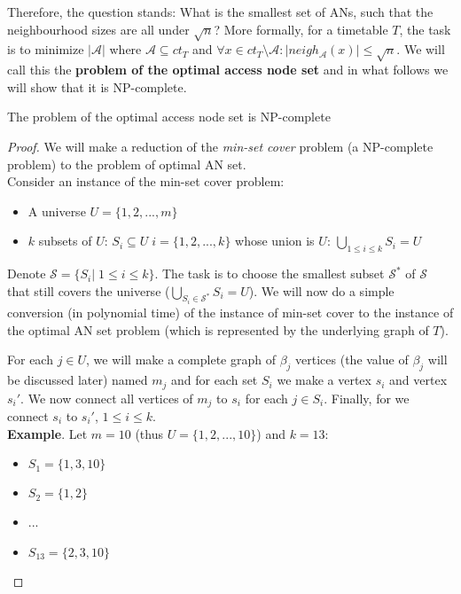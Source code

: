 		Therefore, the question stands: What is the smallest set of ANs, such that the neighbourhood sizes are all under $\sqrt{n}$? More formally, for a timetable $T$, the task is to minimize $|\mathcal{A}|$ where $\mathcal{A} \subseteq ct_{T}$ and $\forall x \in ct_{T} \setminus \mathcal{A}: |neigh_{\mathcal{A}}(x)| \leq \sqrt{n}$. We will call this the \textbf{problem of the optimal access node set} and in what follows we will show that it is NP-complete.
		
		\begin{theorem}
			The problem of the optimal access node set is NP-complete
		\end{theorem}
		
		\begin{proof}
			We will make a reduction of the \textit{min-set cover} problem (a NP-complete problem) to the problem of optimal AN set. \\
			
			\noindent Consider an instance of the min-set cover problem:
			\begin{itemize}
				\item A universe $U = \{1, 2, ..., m\}$
				\item $k$ subsets of $U$: $S_{i} \subseteq U \; i = \{1, 2, ..., k\}$ whose union is $U$: $\bigcup\limits_{1 \leq i \leq k} S_{i} = U$
			\end{itemize}
			\hspace*{\fill}
			
			\noindent Denote $\mathcal{S} = \{S_{i}| \; 1 \leq i \leq k\}$. The task is to choose the smallest subset $\mathcal{S}^{*}$ of $\mathcal{S}$ that still covers the universe ($\bigcup\limits_{S_{i} \in \mathcal{S}^{*}} S_{i} = U$). We will now do a simple conversion (in polynomial time) of the instance of min-set cover to the instance of the optimal AN set problem (which is represented by the underlying graph of $T$).
			
			 For each $j \in U$, we will make a complete graph of $\beta_{j}$ vertices (the value of $\beta_{j}$ will be discussed later) named $m_{j}$ and for each set $S_{i}$ we make a vertex $s_{i}$ and vertex $s_{i}'$. We now connect all vertices of $m_{j}$ to $s_{i}$ for each $j \in S_{i}$. Finally, for we connect $s_{i}$ to $s_{i}'$, $1 \leq i \leq k$. \\
			 
			\noindent \textbf{Example}. Let $m = 10$ (thus $U = \{1, 2, ..., 10\}$) and $k = 13$:
			\begin{itemize}
				\item $S_{1} = \{1, 3, 10\}$
			 	\item $S_{2} = \{1, 2\}$
			 	\item ...
			 	\item $S_{13} = \{2, 3, 10\}$
			\end{itemize}
			\hspace*{\fill}
			 

\end{proof}
